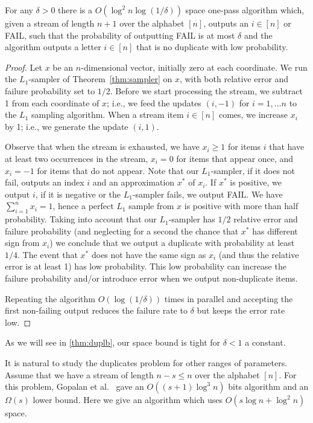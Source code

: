 \begin{theorem}\label{thm:dupub}
For any $\delta>0$ there is a $O(\log^2 n\log(1/\delta))$ space one-pass
algorithm which, given a stream of length $n+1$ over the alphabet $[n]$,
outputs an $i\in[n]$ or FAIL, such that the probability of outputting FAIL
is at most $\delta$ and the algorithm outputs a letter $i\in[n]$ that is no
duplicate with low probability.
\end{theorem}
\begin{proof}
Let $x$ be an $n$-dimensional vector, initially zero at each coordinate. We
run the $L_1$-sampler of Theorem~\ref{thm:sampler} on $x$, with both relative error
and failure probability set to $1/2$. Before we start processing the
stream, we subtract 1 from each coordinate of $x$; i.e., we feed the updates
$(i,-1)$ for $i=1,\ldots n$ to the $L_1$ sampling algorithm. When a stream
item $i\in [n]$ comes, we increase $x_i$ by 1; i.e., we generate the update
$(i,1)$.

Observe that when the stream is exhausted, we have $x_i\geq 1$ for items $i$
that have at least two occurrences in the stream, $x_i=0$ for items that
appear once, and $x_i=-1$ for items that do not appear.  Note that our
$L_1$-sampler, if it does not fail, outputs an index $i$ and an approximation
$x^*$ of $x_i$. If $x^*$ is positive, we output $i$, if it is
negative or the $L_1$-sampler fails, we output FAIL. We have
$\sum_{i=1}^nx_i=1$,  hence a perfect $L_1$ sample from $x$ is positive with
more than half probability. Taking into account that our $L_1$-sampler has
$1/2$ relative error and failure probability (and neglecting for a second the
chance that $x^*$ has different sign from $x_i$) we conclude that we output a
duplicate with probability at least $1/4$. The event that $x^*$ does not have
the same sign as $x_i$ (and thus the relative error is at least 1) has low
probability. This low probability can increase the failure probability and/or
introduce error when we output non-duplicate items.

Repeating the algorithm $O(\log(1/\delta))$ times in parallel and accepting
the first non-failing output reduces the failure rate to
$\delta$ but keeps the error rate low.
\end{proof}

As we will see in \autoref{thm:duplb}, our space bound is tight for
$\delta<1$ a constant. 

It is natural to study the duplicates problem for other ranges of
parameters. Assume that we have a stream of length $n-s\le n$ over the
alphabet $[n]$. For this problem, Gopalan et al.\ \cite{GopalanJaikumar} gave
an $O((s+1)\log^3 n)$ bits algorithm and an $\Omega(s)$ lower bound. Here we
give an algorithm which uses $O(s\log n+\log^2 n)$ space.

